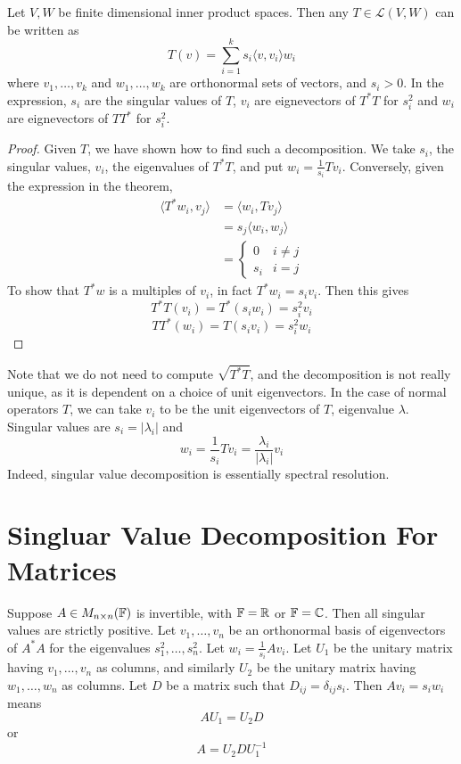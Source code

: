 \documentclass[12pt]{article}
\begin{document}
\begin{thm}
	Let $V,W$ be finite dimensional inner product spaces. Then any $T \in \mathcal L(V,W)$ can be written as
	$$T(v) = \sum_{i=1}^k s_i \langle v,v_i \rangle w_i$$
	where $v_1,\dots,v_k$ and $w_1,\dots,w_k$ are orthonormal sets of vectors, and $s_i > 0$. In the expression, $s_i$ are the singular values of $T$, $v_i$ are eignevectors of $T^*T$ for $s_i^2$ and $w_i$ are eignevectors of $TT^*$ for $s_i^2$.
\end{thm}

\begin{proof}
	Given $T$, we have shown how to find such a decomposition. We take $s_i$, the singular values, $v_i$, the eigenvalues of $T^*T$, and put $w_i = \frac{1}{s_i}Tv_i$. Conversely, given the expression in the theorem,
	\begin{align*}
		\langle T^*w_i,v_j \rangle &= \langle w_i,Tv_j \rangle \\
					   &= s_j \langle w_i,w_j \rangle \\
					   &= \begin{cases} 0 & i \neq j \\ s_i & i = j \end{cases}
	\end{align*}
	To show that $T^*w$ is a multiples of $v_i$, in fact $T^*w_i = s_iv_i$. Then this gives
	$$T^*T(v_i) = T^*(s_iw_i) = s_i^2v_i$$
	$$TT^*(w_i) = T(s_iv_i) = s_i^2w_i$$
\end{proof}

Note that we do not need to compute $\sqrt{T^*T}$, and the decomposition is not really unique, as it is dependent on a choice of unit eigenvectors. In the case of normal operators $T$, we can take $v_i$ to be the unit eigenvectors of $T$, eigenvalue $\lambda$. Singular values are $s_i = |\lambda_i|$ and
$$w_i = \frac{1}{s_i}Tv_i = \frac{\lambda_i}{|\lambda_i|}v_i$$
Indeed, singular value decomposition is essentially spectral resolution.

\section{Singluar Value Decomposition For Matrices}

Suppose $A \in M_{n\times n}(\mathbb{F})$ is invertible, with $\mathbb{F} = \mathbb{R}$ or $\mathbb{F} = \mathbb{C}$. Then all singular values are strictly positive. Let $v_1,\dots,v_n$ be an orthonormal basis of eigenvectors of $A^*A$ for the eigenvalues $s_1^2,\dots,s_n^2$. Let $w_i = \frac{1}{s_i}Av_i$. Let $U_1$ be the unitary matrix having $v_1,\dots,v_n$ as columns, and similarly $U_2$ be the unitary matrix having $w_1,\dots,w_n$ as columns. Let $D$ be a matrix such that $D_{ij} = \delta_{ij}s_i$. Then $Av_i = s_iw_i$ means
$$AU_1 = U_2D$$
or
$$A = U_2DU_1^{-1}$$
\end{document}
